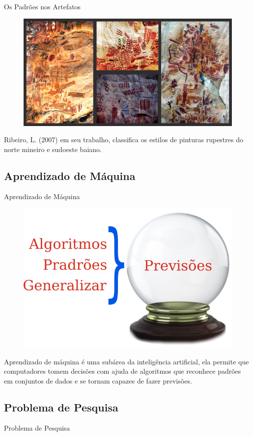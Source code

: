     \begin{frame}[fragile]{Os Padrões nos Artefatos}
        \begin{figure}[H]
        \begin{center}
            \includegraphics[scale=0.60]{images/arte_rupestre.png}
        \end{center}
        \end{figure}

        Ribeiro, L. (2007) em seu trabalho, classifica os estilos de pinturas
        rupestres do norte mineiro e sudoeste baiano.
    \end{frame}

\subsection{Aprendizado de Máquina}
    \begin{frame}[fragile]{Aprendizado de Máquina}
        \begin{figure}[H]
        \begin{center}
            \includegraphics[scale=0.50]{images/previsao.png}
        \end{center}
        \end{figure}

  Aprendizado de máquina é uma subárea da inteligência artificial, ela permite
que computadores tomem decisões com ajuda de algoritmos que reconhece
padrões em conjuntos de dados e se tornam capazes de fazer previsões.
  \end{frame}

\subsection{Problema de Pesquisa}
  \begin{frame}[fragile]{Problema de Pesquisa}
  \end{frame}
